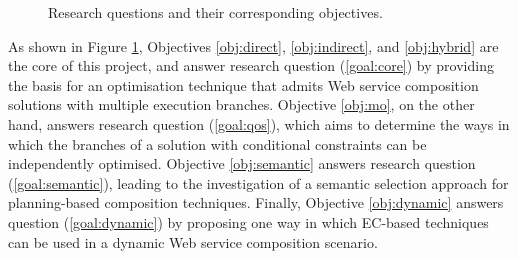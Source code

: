  \begin{figure}
\centerline{
}
\caption{Research questions and their corresponding objectives.}
\label{fig:objectives}
\end{figure}

As shown in Figure \ref{fig:objectives}, Objectives \ref{obj:direct}, \ref{obj:indirect}, and \ref{obj:hybrid} are the core of this project, and answer research question (\ref{goal:core}) by providing the basis for an optimisation technique that admits Web service composition solutions with multiple execution branches. Objective \ref{obj:mo}, on the other hand, answers research question (\ref{goal:qos}), which aims to determine the ways in which the branches of a solution with conditional constraints can be independently optimised. Objective \ref{obj:semantic} answers research question (\ref{goal:semantic}), leading to the investigation of a semantic selection approach for planning-based composition techniques. Finally, Objective \ref{obj:dynamic} answers question (\ref{goal:dynamic}) by proposing one way in which EC-based techniques can be used in a dynamic Web service composition scenario.

